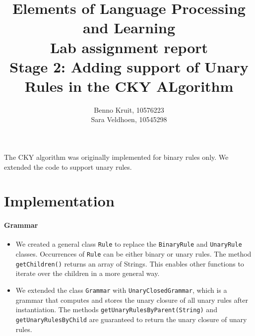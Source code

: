 \documentclass{article}
\title{Elements of Language Processing and Learning\\
Lab assignment report\\
Stage 2: Adding support of Unary Rules in the CKY ALgorithm}
\author{Benno Kruit, 10576223\\Sara Veldhoen, 10545298}
\begin{document}
\maketitle

The CKY algorithm was originally implemented for binary rules only. We extended the code to support unary rules.
\section{Implementation}
\paragraph{Grammar}
\begin{itemize}
\item We created a general class {\tt Rule} to replace the {\tt BinaryRule} and {\tt UnaryRule} classes. Occurrences of {\tt Rule} can be either binary or unary rules. The method {\tt getChildren()} returns an array of Strings. This enables other functions to iterate over the children in a more general way.

\item We extended the class {\tt Grammar} with {\tt UnaryClosedGrammar}, which is a grammar that computes and stores the unary closure of all unary rules after instantiation. The methods {\tt getUnaryRulesByParent(String)} and {\tt getUnaryRulesByChild} are guaranteed to return the unary closure of unary rules.

\end{itemize}
\end{document}

